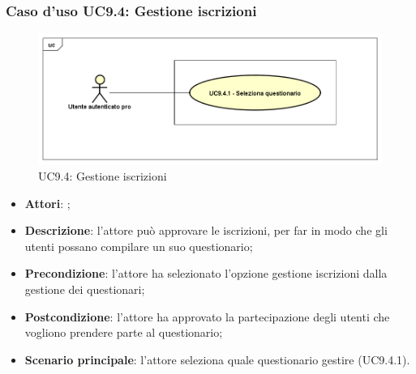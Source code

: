 	 \subsubsection{Caso d'uso UC9.4: Gestione iscrizioni}
	 \label{UC9.4}
	 \begin{figure}[h]
	 	\centering
	 	\includegraphics[scale=0.5,keepaspectratio]{UML/UC9_4.png}
	 	\caption{UC9.4: Gestione iscrizioni}
	 \end{figure}
	 \FloatBarrier
	 \begin{itemize}
	 	\item \textbf{Attori}: \uaupro{};
	 	\item \textbf{Descrizione}: l'attore può approvare le iscrizioni, per far in modo che gli utenti possano compilare un suo questionario;
	 	\item \textbf{Precondizione}: l'attore ha selezionato l'opzione gestione iscrizioni dalla gestione dei questionari;
	 	\item \textbf{Postcondizione}: l'attore ha approvato la partecipazione degli utenti che vogliono prendere parte al questionario;
	 	\item \textbf{Scenario principale}: l'attore seleziona quale questionario gestire (UC9.4.1).
	 \end{itemize}
	 

